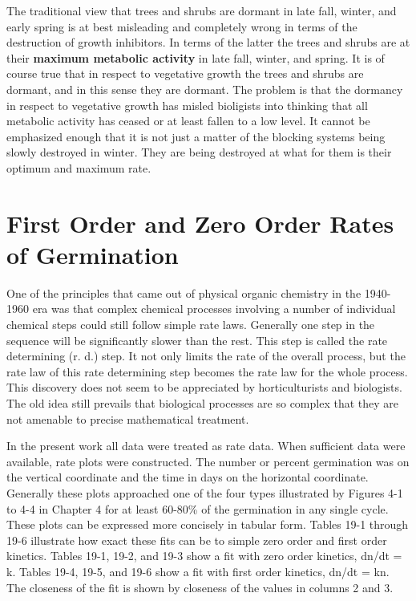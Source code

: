The traditional view that trees and shrubs are dormant in late fall, winter, and
early spring is at best misleading and completely wrong in terms of the destruction of
growth inhibitors. In terms of the latter the trees and shrubs are at their \textbf{maximum
metabolic activity} in late fall, winter, and spring. It is of course true that in respect to
vegetative growth the trees and shrubs are dormant, and in this sense they are
dormant. The problem is that the dormancy in respect to vegetative growth has misled
bioligists into thinking that all metabolic activity has ceased or at least fallen to a low
level. It cannot be emphasized enough that it is not just a matter of the blocking
systems being slowly destroyed in winter. They are being destroyed at what for them
is their optimum and maximum rate.

\section[First and Zero Order Rates]{First Order and Zero Order Rates of Germination}

One of the principles that came out of physical organic chemistry in the 1940-
1960 era was that complex chemical processes involving a number of individual
chemical steps could still follow simple rate laws. Generally one step in the sequence
will be significantly slower than the rest. This step is called the rate determining (r. d.)
step. It not only limits the rate of the overall process, but the rate law of this rate
determining step becomes the rate law for the whole process. This discovery does not
seem to be appreciated by horticulturists and biologists. The old idea still prevails that
biological processes are so complex that they are not amenable to precise
mathematical treatment.

In the present work all data were treated as rate data. When sufficient data
were available, rate plots were constructed. The number or percent germination was
on the vertical coordinate and the time in days on the horizontal coordinate. Generally
these plots approached one of the four types illustrated by Figures 4-1 to 4-4 in
Chapter 4 for at least 60-80\% of the germination in any single cycle. These plots can
be expressed more concisely in tabular form. Tables 19-1 through 19-6 illustrate how
exact these fits can be to simple zero order and first order kinetics. Tables 19-1, 19-2,
and 19-3 show a fit with zero order kinetics, dn/dt = k. Tables 19-4, 19-5, and 19-6
show a fit with first order kinetics, dn/dt = kn. The closeness of the fit is shown by
closeness of the values in columns 2 and 3.

